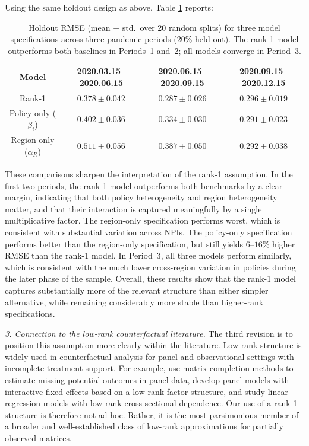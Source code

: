 \documentclass[letterpaper,twoside,11pt]{reviewresponse}
\begin{document}
\begin{enumerate}
	Using the same holdout design as above, Table \ref{tab:alt_specs} reports:
	\begin{table}[h!]
		\centering
		\begin{tabular}{|c|c|c|c|}
			\hline Model & 2020.03.15--2020.06.15 & 2020.06.15--2020.09.15 & 2020.09.15--2020.12.15\\\hline
			Rank-1 & $\mathbf{0.378} \pm 0.042$ & $\mathbf{0.287} \pm 0.026$ & $0.296 \pm 0.019$ \\
			Policy-only ($\beta_i$) & $0.402 \pm 0.036$ & $0.334 \pm 0.030$ & $0.291 \pm 0.023$ \\
			Region-only ($\alpha_R$) & $0.511 \pm 0.056$ & $0.387 \pm 0.050$ & $0.292 \pm 0.038$ \\\hline
		\end{tabular}
		\caption{Holdout RMSE (mean $\pm$ std.\ over 20 random splits) for three model specifications across three pandemic periods (20\% held out). The rank-1 model outperforms both baselines in Periods~1 and~2; all models converge in Period~3.}
		\label{tab:alt_specs}
	\end{table}
	
	These comparisons sharpen the interpretation of the rank-1 assumption. In the first two periods, the rank-1 model outperforms both benchmarks by a clear margin, indicating that both policy heterogeneity and region heterogeneity matter, and that their interaction is captured meaningfully by a single multiplicative factor. The region-only specification performs worst, which is consistent with substantial variation across NPIs. The policy-only specification performs better than the region-only specification, but still yields $6$--$16\%$ higher RMSE than the rank-1 model. In Period~3, all three models perform similarly, which is consistent with the much lower cross-region variation in policies during the later phase of the sample. Overall, these results show that the rank-1 model captures substantially more of the relevant structure than either simpler alternative, while remaining considerably more stable than higher-rank specifications.
	
	\textit{3. Connection to the low-rank counterfactual literature.}  
	The third revision is to position this assumption more clearly within the literature. Low-rank structure is widely used in counterfactual analysis for panel and observational settings with incomplete treatment support. For example, \citet{athey2021matrix} use matrix completion methods to estimate missing potential outcomes in panel data, \citet{bai2009panel} develop panel models with interactive fixed effects based on a low-rank factor structure, and \citet{moon2015linear} study linear regression models with low-rank cross-sectional dependence. Our use of a rank-1 structure is therefore not ad hoc. Rather, it is the most parsimonious member of a broader and well-established class of low-rank approximations for partially observed matrices.
	

\end{enumerate}
\end{document}
